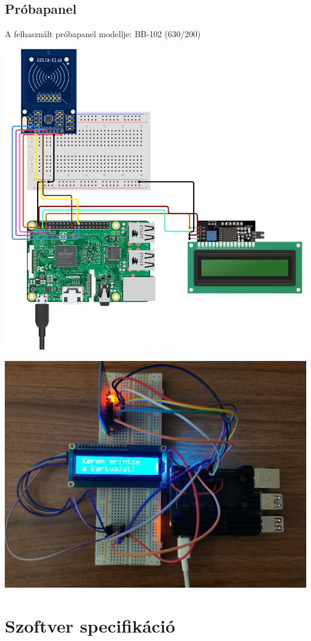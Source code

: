 \documentclass[11pt, a4paper]{article}
\begin{document}
		\subsection{Próbapanel}
			A felhasznált próbapanel modellje: BB-102 (630/200) \\
		\begin{minipage}{\linewidth}
			\centering
			\includegraphics[width=0.7\linewidth]{img/breadboard_diagram}
			\label{fig:1breadboarddiagram}
		\end{minipage}
		\begin{minipage}{\linewidth}
			\centering
			\includegraphics[width=0.7\linewidth]{img/3_futas}
			\label{fig:3futas}
		\end{minipage}
		
	\section{Szoftver specifikáció}
\end{document}
